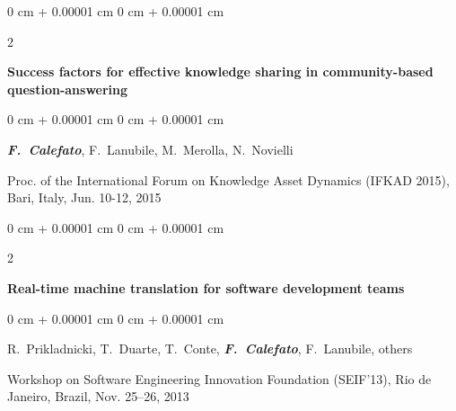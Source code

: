 \documentclass[10pt, a4paper]{article}
\newenvironment{onecolentry}{
    \begin{adjustwidth}{
        0 cm + 0.00001 cm
    }{
        0 cm + 0.00001 cm
    }
}{
    \end{adjustwidth}
} %
\newenvironment{twocolentry}[2][]{
    \onecolentry
    \def\secondColumn{#2}
    \setcolumnwidth{\fill, 4.5 cm}
    \begin{paracol}{2}
}{
    \switchcolumn \raggedleft \secondColumn
    \end{paracol}
    \endonecolentry
} %
\begin{document}
        \begin{samepage}
            \begin{twocolentry}{
                2015
            }
                \textbf{Success factors for effective knowledge sharing in community-based question-answering}
            \end{twocolentry}

            \vspace{0.10 cm}
            
            \begin{onecolentry}
                \mbox{\textbf{\textit{F. Calefato}}}, \mbox{F. Lanubile}, \mbox{M. Merolla}, \mbox{N. Novielli}

                \vspace{0.10 cm}
                
        Proc. of the International Forum on Knowledge Asset Dynamics (IFKAD 2015), Bari, Italy, Jun. 10-12, 2015\end{onecolentry}
        \end{samepage}

        \vspace{0.2 cm}

        \begin{samepage}
            \begin{twocolentry}{
                2013
            }
                \textbf{Real-time machine translation for software development teams}
            \end{twocolentry}

            \vspace{0.10 cm}
            
            \begin{onecolentry}
                \mbox{R. Prikladnicki}, \mbox{T. Duarte}, \mbox{T. Conte}, \mbox{\textbf{\textit{F. Calefato}}}, \mbox{F. Lanubile}, \mbox{others}

                \vspace{0.10 cm}
                
        Workshop on Software Engineering Innovation Foundation (SEIF'13), Rio de Janeiro, Brazil, Nov. 25–26, 2013\end{onecolentry}
        \end{samepage}

        \vspace{0.2 cm}
\end{document}
